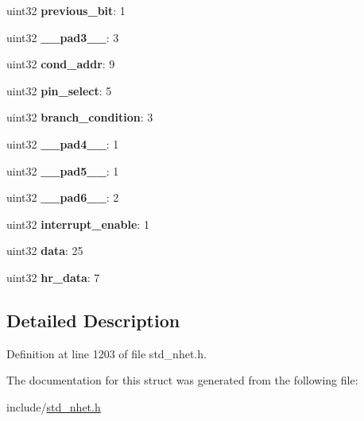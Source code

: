 \begin{DoxyCompactItemize}
uint32 {\bfseries previous\+\_\+bit}\+: 1
\item 
\mbox{\label{structbr__format_ab95e6d6e4547cb6a81f9befb8bb0f6eb}} 
uint32 {\bfseries \+\_\+\+\_\+pad3\+\_\+\+\_\+}\+: 3
\item 
\mbox{\label{structbr__format_a3d53801f643ef27848018d40c3b9582a}} 
uint32 {\bfseries cond\+\_\+addr}\+: 9
\item 
\mbox{\label{structbr__format_a76cde7d925581e35744d383eeef98cd1}} 
uint32 {\bfseries pin\+\_\+select}\+: 5
\item 
\mbox{\label{structbr__format_a14bf7e723bd66fa849e12b78ac32e812}} 
uint32 {\bfseries branch\+\_\+condition}\+: 3
\item 
\mbox{\label{structbr__format_a2608ec7e7147fabcfaebcccc2bd02313}} 
uint32 {\bfseries \+\_\+\+\_\+pad4\+\_\+\+\_\+}\+: 1
\item 
\mbox{\label{structbr__format_a1ae8cd0cfec4a3cc6289f3118855d7b0}} 
uint32 {\bfseries \+\_\+\+\_\+pad5\+\_\+\+\_\+}\+: 1
\item 
\mbox{\label{structbr__format_ae62db2c559c5850cf42035124fae2d0f}} 
uint32 {\bfseries \+\_\+\+\_\+pad6\+\_\+\+\_\+}\+: 2
\item 
\mbox{\label{structbr__format_af047c60164a838f333ac7d5a05e7ddc4}} 
uint32 {\bfseries interrupt\+\_\+enable}\+: 1
\item 
\mbox{\label{structbr__format_a044baa2ff7d5486a61b9d78bf465bede}} 
uint32 {\bfseries data}\+: 25
\item 
\mbox{\label{structbr__format_a5f3532f9936a1a3ea777a9117d0bd440}} 
uint32 {\bfseries hr\+\_\+data}\+: 7
\end{DoxyCompactItemize}


\subsection{Detailed Description}


Definition at line 1203 of file std\+\_\+nhet.\+h.



The documentation for this struct was generated from the following file\+:\begin{DoxyCompactItemize}
\item 
include/\mbox{\hyperlink{std__nhet_8h}{std\+\_\+nhet.\+h}}\end{DoxyCompactItemize}
